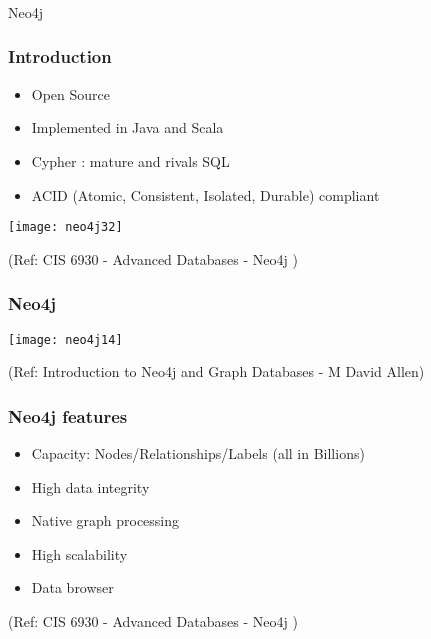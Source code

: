 \begin{frame}[fragile]\frametitle{}
\begin{center}
{\Large Neo4j}
\end{center}
\end{frame}


\begin{frame}\frametitle{Introduction}

\begin{itemize}
\item Open Source
\item Implemented in Java and Scala
\item Cypher : mature and rivals SQL
\item ACID (Atomic, Consistent, Isolated, Durable) compliant
\end{itemize}


\begin{center}
\texttt{[image: neo4j32]}
\end{center}	

{\tiny (Ref: CIS 6930 - Advanced Databases - Neo4j )}
\end{frame}


\begin{frame}[fragile]\frametitle{Neo4j}

\begin{center}
\texttt{[image: neo4j14]}
\end{center}	  

{\tiny (Ref: Introduction to Neo4j and Graph Databases
 - M David Allen)}

\end{frame}

\begin{frame}\frametitle{Neo4j features}

\begin{itemize}
\item Capacity: Nodes/Relationships/Labels (all in Billions)
\item High data integrity
\item Native graph processing
\item High scalability
\item Data browser
\end{itemize}



{\tiny (Ref: CIS 6930 - Advanced Databases - Neo4j )}
\end{frame}




